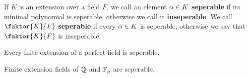 \begin{definition}
  If $K$ is an extension over a field $F$, we call an element $\alpha \in K$
  \textbf{seperable} if its minimal polynomial is seperable, otherwise we call
  it \textbf{inseperable}. We call $\faktor{K}{F}$ \textbf{seperable} if every
  $\alpha \in K$ is seperable; otherwise we say that  $\faktor{K}{F}$ is
  inseperable.
\end{definition}

\begin{lemma}\label{lemma_8.6.10}
  Every fnite extension of a perfect field is seperable.
\end{lemma}
\begin{corollary}
  Finite extension fields of $\mathbb{Q}$ and  $\mathbb{F}_p$ are seperable.
\end{corollary}
